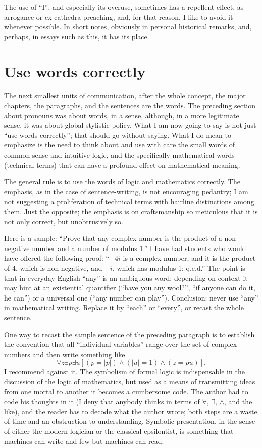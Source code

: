 \documentclass[12pt]{article}
\begin{document}
The use of ``I'', and especially its overuse, sometimes has a repellent effect, as arrogance or ex-cathedra preaching, and, for that reason, I like to avoid it whenever possible. In short notes, obviously in personal historical remarks, and, perhaps, in essays such as this, it has its place.

\section{Use words correctly}

The next smallest units of communication, after the whole concept, the major chapters, the paragraphs, and the sentences are the words. The preceding section about pronouns was about words, in a sense, although, in a more legitimate sense, it was about global stylistic policy. What I am now going to say is not just ``use words correctly''; that should go without saying. What I do mean to emphasize is the need to think about and use with care the small words of common sense and intuitive logic, and the specifically mathematical words (technical terms) that can have a profound effect on mathematical meaning. 

The general rule is to use the words of logic and mathematics correctly. The emphasis, as in the case of sentence-writing, is not encouraging pedantry; I am not suggesting a proliferation of technical terms with hairline distinctions among them. Just the opposite; the emphasis is on craftsmanship so meticulous that it is not only correct, but unobtrusively so. 

Here is a sample: ``Prove that any complex number is the product of a non-negative number and a number of modulus 1.'' I have had students who would have offered the following proof: ``$-4i$ is a complex number, and it is the product of 4, which is non-negative, and $-i$, which has modulus 1; q.e.d.'' The point is that in everyday English ``any'' is an ambiguous word; depending on context it may hint at an existential quantifier (``have you any wool?'', ``if anyone can do it, he can'') or a universal one (``any number can play''). Conclusion: never use ``any'' in mathematical writing. Replace it by ``each'' or ``every'', or recast the whole sentence.

One way to recast the sample sentence of the preceding paragraph is to establish the convention that all ``individual variables'' range over the set of complex numbers and then write something like \[\forall z \exists p \exists u[(p=|p|)\wedge(|u|=1)\wedge(z=pu)].\] I recommend against it. The symbolism of formal logic is indispensable in the discussion of the logic of mathematics, but used as a means of transmitting ideas from one mortal to another it becomes a cumbersome code. The author had to code his thoughts in it (I deny that anybody thinks in terms of $\forall$, $\exists$, $\wedge$, and the like), and the reader has to decode what the author wrote; both steps are a waste of time and an obstruction to understanding. Symbolic presentation, in the sense of either the modern logician or the classical epsilontist, is something that machines can write and few but machines can read. 
\end{document}
